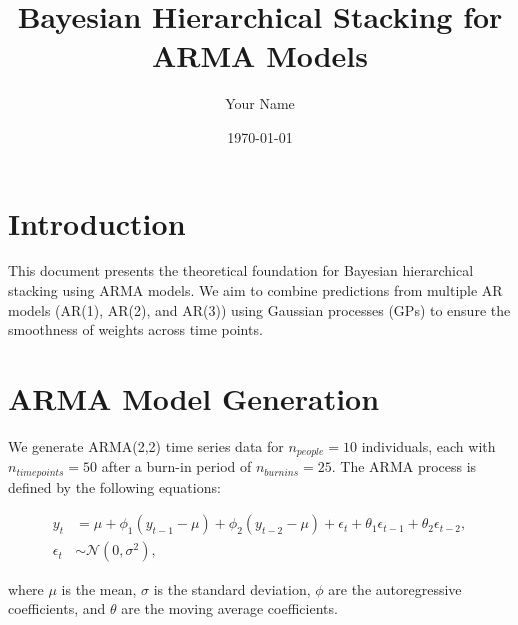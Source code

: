 \documentclass{article}
\title{Bayesian Hierarchical Stacking for ARMA Models}
\author{Your Name}
\date{\today}
\begin{document}


\maketitle

\section{Introduction}

This document presents the theoretical foundation for Bayesian hierarchical stacking using ARMA models. We aim to combine predictions from multiple AR models (AR(1), AR(2), and AR(3)) using Gaussian processes (GPs) to ensure the smoothness of weights across time points.

\section{ARMA Model Generation}

We generate ARMA(2,2) time series data for $n_{people} = 10$ individuals, each with $n_{timepoints} = 50$ after a burn-in period of $n_{burnins} = 25$. The ARMA process is defined by the following equations:

\begin{align}
  y_t &= \mu + \phi_1 (y_{t-1} - \mu) + \phi_2 (y_{t-2} - \mu) + \epsilon_t + \theta_1 \epsilon_{t-1} + \theta_2 \epsilon_{t-2}, \\
  \epsilon_t &\sim \mathcal{N}(0, \sigma^2),
\end{align}

where $\mu$ is the mean, $\sigma$ is the standard deviation, $\phi$ are the autoregressive coefficients, and $\theta$ are the moving average coefficients.
\end{document}
